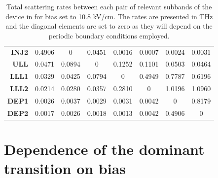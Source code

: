 \documentclass[twocolumn,secnumarabic,amssymb, nobibnotes, aps, prd]{revtex4-1}
\begin{document}
{\begin{appendices}
\begin{table}[H]
\begin{tabular}{ r | c c c c c c c}
						\textbf{INJ2}  & 0.4906      &    0 &    0.0451  &   0.0016 &    0.0007  &   0.0024 &    0.0031 \\
						\textbf{ULL}  &    0.0471  &   0.0894   &       0 &    0.1252  &   0.1101 &    0.0503 &    0.0464  \\
						\textbf{LLL1}  &   0.0329  &   0.0425  &   0.0794   &       0  &   0.4949  &   0.7787 &    0.6196 \\
						\textbf{LLL2}  &0.0214   &  0.0280  &   0.0357  &   0.2810    &      0  &   1.0196 &    1.0960\\ 
						\textbf{DEP1}  &   0.0026  &  0.0037  &   0.0029 &    0.0031 &    0.0042   &       0   &  0.8179  \\
						\textbf{DEP2}  & 0.0017  &   0.0026  &   0.0018  &   0.0013   &  0.0042 &    0.4906    &      0\\
						\hline 
					\end{tabular}
					\caption[Table caption text]{ Total scattering rates between each pair of relevant subbands of the device in \cite{burghoff2014terahertz} for bias set to 10.8 kV/cm. The rates are presented in THz and the diagonal elements are set to zero as they will depend on the periodic boundary conditions employed.}
					\label{tab:table02}
				\end{table}
				
				
				\section{Dependence of the dominant transition on bias}
				

\end{appendices}}
\end{document}
